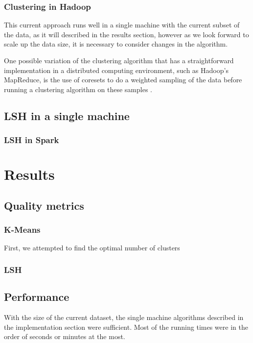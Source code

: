 \documentclass[10pt,a4paper]{scrartcl}
\begin{document}
      \subsubsection{Clustering in Hadoop}
      \label{sec:implementation:subsec:hadoop}
        This current approach runs well in a single machine with the current
        subset of the data, as it will described in the results section,
        however as we look forward to scale up the data size, it is necessary
        to consider changes in the algorithm.
        
        One possible variation of the clustering algorithm that has a
        straightforward implementation in a distributed computing environment,
        such as Hadoop's MapReduce, is the use of coresets to do a weighted
        sampling of the data before running a clustering algorithm on these
        samples \cite{feldman2011scalable}.
    \subsection{LSH in a single machine}
      \subsubsection{LSH in Spark} \label{sec:implementation:subsec:spark}
  \section{Results}
    \subsection{Quality metrics}
      \subsubsection{K-Means}
        First, we attempted to find the optimal number of clusters
      \subsubsection{LSH}
    \subsection{Performance}
      With the size of the current dataset, the single machine algorithms
      described in the implementation section were sufficient. Most of the
      running times were in the order of seconds or minutes at the most.
      
\end{document}
